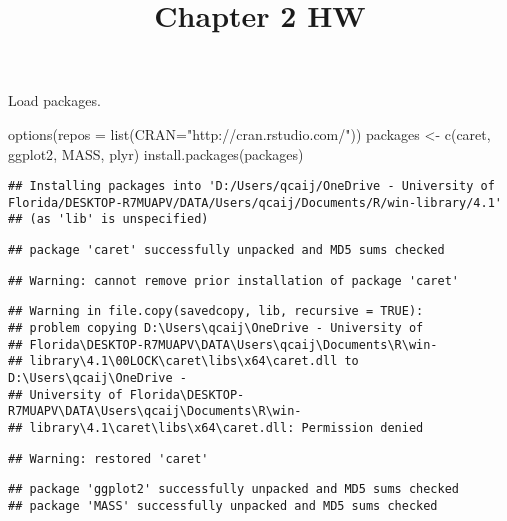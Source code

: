 \documentclass[
]{article}
\title{Chapter 2 HW}
\author{}
\date{\vspace{-2.5em}}
\newenvironment{Shaded}{\begin{snugshade}}{\end{snugshade}}
\newcommand{\AttributeTok}[1]{\textcolor[rgb]{0.77,0.63,0.00}{#1}}
\newcommand{\FunctionTok}[1]{\textcolor[rgb]{0.00,0.00,0.00}{#1}}
\newcommand{\NormalTok}[1]{#1}
\newcommand{\OtherTok}[1]{\textcolor[rgb]{0.56,0.35,0.01}{#1}}
\newcommand{\StringTok}[1]{\textcolor[rgb]{0.31,0.60,0.02}{#1}}
\begin{document}
\maketitle

Load packages.

\begin{Shaded}
\begin{Highlighting}[]
\FunctionTok{options}\NormalTok{(}\AttributeTok{repos =} \FunctionTok{list}\NormalTok{(}\AttributeTok{CRAN=}\StringTok{"http://cran.rstudio.com/"}\NormalTok{))}
\NormalTok{packages }\OtherTok{\textless{}{-}} \FunctionTok{c}\NormalTok{(}\StringTok{\textquotesingle{}caret\textquotesingle{}}\NormalTok{, }\StringTok{\textquotesingle{}ggplot2\textquotesingle{}}\NormalTok{, }\StringTok{\textquotesingle{}MASS\textquotesingle{}}\NormalTok{, }\StringTok{\textquotesingle{}plyr\textquotesingle{}}\NormalTok{)}
\FunctionTok{install.packages}\NormalTok{(packages)}
\end{Highlighting}
\end{Shaded}

\begin{verbatim}
## Installing packages into 'D:/Users/qcaij/OneDrive - University of Florida/DESKTOP-R7MUAPV/DATA/Users/qcaij/Documents/R/win-library/4.1'
## (as 'lib' is unspecified)
\end{verbatim}

\begin{verbatim}
## package 'caret' successfully unpacked and MD5 sums checked
\end{verbatim}

\begin{verbatim}
## Warning: cannot remove prior installation of package 'caret'
\end{verbatim}

\begin{verbatim}
## Warning in file.copy(savedcopy, lib, recursive = TRUE):
## problem copying D:\Users\qcaij\OneDrive - University of
## Florida\DESKTOP-R7MUAPV\DATA\Users\qcaij\Documents\R\win-
## library\4.1\00LOCK\caret\libs\x64\caret.dll to D:\Users\qcaij\OneDrive -
## University of Florida\DESKTOP-R7MUAPV\DATA\Users\qcaij\Documents\R\win-
## library\4.1\caret\libs\x64\caret.dll: Permission denied
\end{verbatim}

\begin{verbatim}
## Warning: restored 'caret'
\end{verbatim}

\begin{verbatim}
## package 'ggplot2' successfully unpacked and MD5 sums checked
## package 'MASS' successfully unpacked and MD5 sums checked
\end{verbatim}
\end{document}
